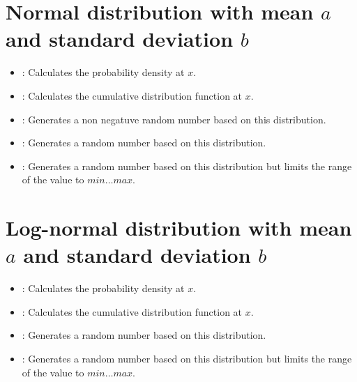 \section{Normal distribution with mean \texorpdfstring{$a$}{a} and standard deviation \texorpdfstring{$b$}{b}}

\begin{itemize}

\item
{}:
Calculates the probability density at $x$.

\item
{}:
Calculates the cumulative distribution function at $x$.

\item
{}:
Generates a non negatuve random number based on this distribution.

\item
{}:
Generates a random number based on this distribution.

\item
{}:
Generates a random number based on this distribution but limits the range of the value to $min\ldots max$.

\end{itemize}



\section{Log-normal distribution with mean \texorpdfstring{$a$}{a} and standard deviation \texorpdfstring{$b$}{b}}

\begin{itemize}

\item
{}:
Calculates the probability density at $x$.

\item
{}:
Calculates the cumulative distribution function at $x$.

\item
{}:
Generates a random number based on this distribution.

\item
{}:
Generates a random number based on this distribution but limits the range of the value to $min\ldots max$.

\end{itemize}



